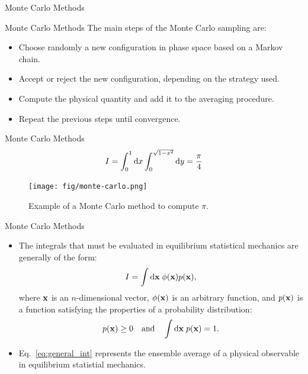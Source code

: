 \documentclass[10pt]{beamer}
\begin{document}
\begin{frame}{}
  \begin{center}
    \fontsize{25pt}{6}\selectfont\vspace{1.2cm}
    \textcolor{subtitle}{Monte Carlo Methods}
  \end{center}
\end{frame}

\begin{frame}{Monte Carlo Methods}
The main steps of the Monte Carlo sampling are:
\vspace*{0.5cm}
\begin{itemize}
\setlength\itemsep{1em}
  \item Choose randomly a new configuration in phase space based on a Markov chain.
  \item Accept or reject the new configuration, depending on the strategy used.
  \item Compute the physical quantity and add it to the averaging procedure.
  \item Repeat the previous steps until convergence.
\end{itemize}
\end{frame}

\begin{frame}{Monte Carlo Methods}
\begin{equation}
  I = \int_0^1\mathrm{d} x \int_0^{\sqrt{1-x^2}}\mathrm{d} y = \frac{\pi}{4}
\end{equation}
\begin{figure}
\centering
  \texttt{[image: fig/monte-carlo.png]}
  \caption{Example of a Monte Carlo method to compute $\pi$.}
\end{figure}
\end{frame}

\begin{frame}{Monte Carlo Methods}
\begin{itemize}
\setlength\itemsep{1em}
  \item The integrals that must be evaluated in equilibrium statistical mechanics are generally of the form:
  \begin{equation}
  \label{eq:general_int}
    I = \int\mathrm{d} {\bf x}\; \phi({\bf x}) p({\bf x}),
  \end{equation}
  where ${\bf x}$ is an $n$-dimensional vector, $\phi({\bf x})$ is an arbitrary function, and $p({\bf x})$ is a function satisfying the properties of a probability distribution:
  \begin{equation}
    p({\bf x})\geq 0~~~\mathrm{and}~~~\int\mathrm{d}{\bf x}\; p({\bf x}) = 1.
  \end{equation}

  \item Eq.~\ref{eq:general_int} represents the ensemble average of a physical observable in equilibrium statistial mechanics.
\end{itemize}
\end{frame}
\end{document}
